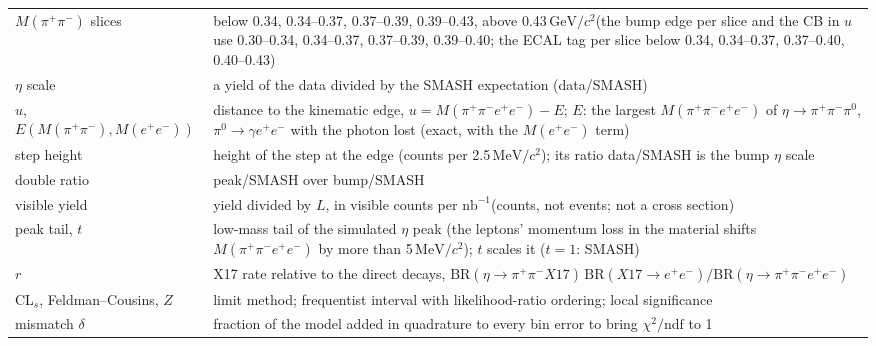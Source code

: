 \documentclass[11pt,a4paper]{article}
\newcommand{\piz}{\ensuremath{\pi^{0}}\xspace}
\newcommand{\ee}{\ensuremath{e^{+}e^{-}}\xspace}
\newcommand{\pipi}{\ensuremath{\pi^{+}\pi^{-}}\xspace}
\newcommand{\ppee}{\ensuremath{\pi^{+}\pi^{-}e^{+}e^{-}}\xspace}
\newcommand{\Mfour}{\ensuremath{M(\pi^{+}\pi^{-}e^{+}e^{-})}\xspace}
\newcommand{\Mee}{\ensuremath{M(e^{+}e^{-})}\xspace}
\newcommand{\Mpipi}{\ensuremath{M(\pi^{+}\pi^{-})}\xspace}
\newcommand{\nbinv}{\ensuremath{\mathrm{nb}^{-1}}\xspace}
\newcommand{\GeVcc}{\ensuremath{\mathrm{GeV}/c^{2}}\xspace}
\newcommand{\MeVcc}{\ensuremath{\mathrm{MeV}/c^{2}}\xspace}
\newcommand{\BRX}{\ensuremath{\mathrm{BR}(\eta\to\pipi X17)\,\mathrm{BR}(X17\to\ee)}\xspace}
\begin{document}
{\begin{longtable}{@{}>{\raggedright\arraybackslash}p{3.6cm} >{\raggedright\arraybackslash}p{\dimexpr\textwidth-3.6cm-2\tabcolsep\relax}@{}}
\Mpipi slices & below 0.34, 0.34--0.37, 0.37--0.39, 0.39--0.43, above 0.43\,\GeVcc (the bump edge per slice and the CB in $u$ use 0.30--0.34, 0.34--0.37, 0.37--0.39, 0.39--0.40; the ECAL tag per slice below 0.34, 0.34--0.37, 0.37--0.40, 0.40--0.43) \\
$\eta$ scale & a yield of the data divided by the SMASH expectation (data/SMASH) \\
$u$, $E(\Mpipi,\Mee)$ & distance to the kinematic edge, $u=\Mfour-E$; $E$: the largest \Mfour of $\eta\to\pipi\piz$, $\piz\to\gamma\ee$ with the photon lost (exact, with the \Mee term) \\
step height & height of the step at the edge (counts per 2.5\,\MeVcc); its ratio data/SMASH is the bump $\eta$ scale \\
double ratio & peak/SMASH over bump/SMASH \\
visible yield & yield divided by $L$, in visible counts per \nbinv (counts, not events; not a cross section) \\
peak tail, $t$ & low-mass tail of the simulated $\eta$ peak (the leptons' momentum loss in the material shifts \Mfour by more than 5\,\MeVcc); $t$ scales it ($t=1$: SMASH) \\
$r$ & X17 rate relative to the direct decays, $\BRX/\mathrm{BR}(\eta\to\ppee)$ \\
CL$_s$, Feldman--Cousins, $Z$ & limit method; frequentist interval with likelihood-ratio ordering; local significance \\
mismatch $\delta$ & fraction of the model added in quadrature to every bin error to bring $\chi^2/\mathrm{ndf}$ to 1 \\
\end{longtable}
}
\end{document}
